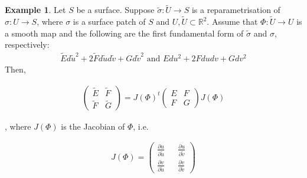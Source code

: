 \documentclass{article}
\theoremstyle{plain}
\theoremstyle{definition}
\newtheorem{example}{Example}
\theoremstyle{remark}
\newcommand{\R}{\mathbb{R}}
\begin{document}
\begin{example} \label{eg: reparmetrisation affect on the first fundamental form}
    Let \(S\) be a surface. Suppose \(\tilde{\sigma}: \tilde{U} \rightarrow S \) is a reparametrisation of \(\sigma: U \rightarrow S \), where \(\sigma\) is a surface patch of \(S\) and \( U, \tilde{U} \subset \R^2 \).
    Assume that \( \Phi: \tilde{U} \rightarrow U\) is a smooth map and the following are the first fundamental form of \(\tilde{\sigma}\) and \(\sigma\), respectively:
    \begin{align*}
        \tilde{E} d\tilde{u}^2 + 2\tilde{F} d\tilde{u} d\tilde{v} + G d\tilde{v}^2
        \text{  and  }
        E du^2 + 2F du dv + G dv^2
    \end{align*}
    Then,
\end{example}
\begin{align} \label{eq: reparmetrisation affect on the first fundamental form}
    \begin{pmatrix}
        \tilde{E} & \tilde{F} \\
        \tilde{F} & \tilde{G}
    \end{pmatrix}
    =
    J(\Phi)^t
    \begin{pmatrix}
        E & F \\
        F & G
    \end{pmatrix}
    J(\Phi)
\end{align}

, where \( J(\Phi) \) is the Jacobian of \(\Phi\), i.e.

\begin{align*}
    J(\Phi) =
    \begin{pmatrix}
        \frac{\partial u}{ \partial \tilde{u}} &  & \frac{\partial u}{ \partial \tilde{v}} \\
        \frac{\partial v}{ \partial \tilde{u}} &  & \frac{\partial v}{ \partial \tilde{v}}
    \end{pmatrix}
\end{align*}
\end{document}
